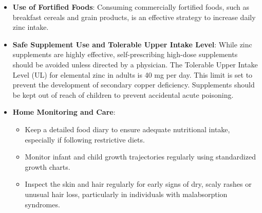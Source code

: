 \begin{itemize}
    \item \textbf{Use of Fortified Foods}: Consuming commercially fortified foods, such as breakfast cereals and grain products, is an effective strategy to increase daily zinc intake.
    \item \textbf{Safe Supplement Use and Tolerable Upper Intake Level}: While zinc supplements are highly effective, self-prescribing high-dose supplements should be avoided unless directed by a physician. The Tolerable Upper Intake Level (UL) for elemental zinc in adults is 40 mg per day. This limit is set to prevent the development of secondary copper deficiency. Supplements should be kept out of reach of children to prevent accidental acute poisoning.
    \item \textbf{Home Monitoring and Care}:
    \begin{itemize}
        \item Keep a detailed food diary to ensure adequate nutritional intake, especially if following restrictive diets.
        \item Monitor infant and child growth trajectories regularly using standardized growth charts.
        \item Inspect the skin and hair regularly for early signs of dry, scaly rashes or unusual hair loss, particularly in individuals with malabsorption syndromes.
    \end{itemize}
\end{itemize}

